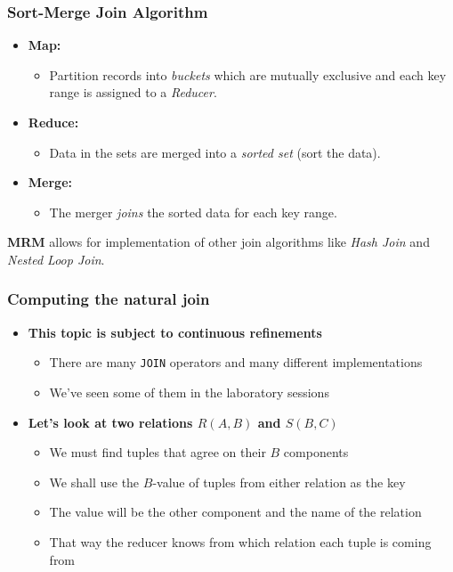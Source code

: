 \documentclass{beamer}
\newcommand{\bi}{\begin{itemize}}
\newcommand{\ei}{\end{itemize}}
\newcommand{\ii}{\item}
\begin{document}


\begin{frame}
\frametitle{Sort-Merge Join Algorithm}

\bi
\ii \textbf{Map:}
\bi
\ii Partition records into \textit{buckets} which are mutually exclusive and each key range is assigned to a \textit{Reducer}.
\ei
\ei

\bi
\ii \textbf{Reduce:}
\bi
\ii Data in the sets are merged into a \textit{sorted set} (sort the data).
\ei
\ei

\bi
\ii \textbf{Merge:}
\bi
\ii The merger \textit{joins} the sorted data for each key range.
\ei
\ei

\textbf{MRM} allows for implementation of other join algorithms like \textit{Hash Join} and \textit{Nested Loop Join}.

\end{frame}



\begin{frame}
\frametitle{Computing the natural join}
\bi
\ii \textbf{This topic is subject to continuous refinements}
\bi
\ii There are many \texttt{JOIN} operators and many different implementations
\ii We've seen some of them in the laboratory sessions
\ei
\ei

\bi
\ii \textbf{Let's look at two relations $R(A, B)$ and $S(B, C)$}
\bi
\ii We must find tuples that agree on their $B$ components
\ii We shall use the $B$-value of tuples from either relation as the key
\ii The value will be the other component and the name of the relation
\ii That way the reducer knows from which relation each tuple is coming from
\ei
\ei

\end{frame}


\end{document}
